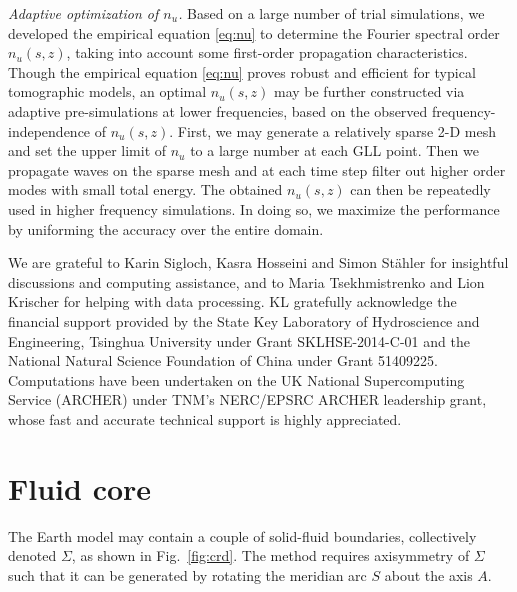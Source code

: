 \documentclass[extra]{gji}
\begin{document}
\textit{Adaptive optimization of $n_u$.}
Based on a large number of trial simulations, we developed
the empirical equation \eqref{eq:nu} to determine the 
Fourier spectral order $n_u\left(s,z\right)$, taking into account some 
first-order propagation characteristics.
Though the empirical equation \eqref{eq:nu} proves robust and efficient
for typical tomographic models, an optimal $n_u\left(s,z\right)$ may be further 
constructed via adaptive pre-simulations at lower frequencies, based on 
the observed frequency-independence of $n_u\left(s,z\right)$. 
First, we may generate a relatively sparse 2-D mesh and set the upper 
limit of $n_u$ to a large number at each GLL point. Then we 
propagate waves on the sparse mesh and at each time step filter out higher
order modes with small total energy. The obtained 
$n_u\left(s,z\right)$ can then be repeatedly used in higher frequency simulations. 
In doing so, we maximize the performance by uniforming the accuracy over
the entire domain. 






\begin{acknowledgments}
We are grateful to Karin Sigloch, Kasra Hosseini and Simon St\"ahler 
for insightful discussions and computing assistance, and to 
Maria Tsekhmistrenko and Lion Krischer for helping with data processing.
KL gratefully acknowledge the financial support
provided by the State Key Laboratory of Hydroscience and Engineering,
Tsinghua University under Grant SKLHSE-2014-C-01 and 
the National Natural Science Foundation of China under Grant 51409225.
Computations have been undertaken on the UK National Supercomputing Service 
(ARCHER) under TNM's NERC/EPSRC ARCHER leadership grant,
whose fast and accurate technical support is highly appreciated. 
\end{acknowledgments}

\appendix
\section{Fluid core}
\label{sec:fluid}
The Earth model may contain a couple of solid-fluid boundaries, 
collectively denoted $\Sigma$, as shown in Fig.~\ref{fig:crd}. 
The method requires axisymmetry of $\Sigma$ such that it can 
be generated by rotating the meridian arc $S$ about the axis $A$. 
\end{document}
